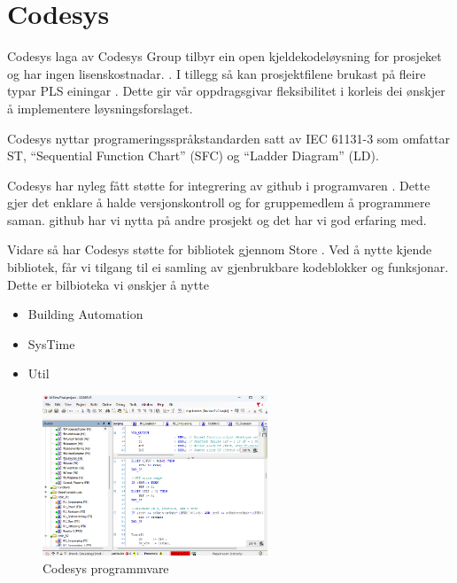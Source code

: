 \section{Codesys}
\thispagestyle{fancy}
\gls{Codesys} \citep{Codesys} laga av \gls{Codesys} Group tilbyr ein open kjeldekodeløysning for prosjeket og har ingen lisenskostnadar. \citep{CodesysLisens}. 
I tillegg så kan prosjektfilene brukast på fleire typar PLS einingar \citep{CodesysPLS}. 
Dette gir vår oppdragsgivar fleksibilitet i korleis dei ønskjer å implementere løysningsforslaget.

\gls{Codesys} nyttar programeringsspråkstandarden satt av \gls{IEC} 61131-3 som omfattar \gls{ST}, ``Sequential Function Chart'' (\gls{SFC}) og ``Ladder Diagram'' (\gls{LD}). 

\gls{Codesys} har nyleg fått støtte for integrering av \gls{github} i programvaren \citep{CodesysGIT}. 
Dette gjer det enklare å halde versjonskontroll og for gruppemedlem å programmere saman. 
\gls{github} har vi nytta på andre prosjekt og det har vi god erfaring med.

Vidare så har \gls{Codesys} støtte for bibliotek gjennom  Store \citep{CodesysStore}. 
Ved å nytte kjende bibliotek, får vi tilgang til ei samling av gjenbrukbare kodeblokker og funksjonar.
Dette er bilbioteka vi ønskjer å nytte

 
\begin{itemize}
    \item {} Building Automation \citep{BuildingAutomation}
    \item SysTime \citep{DateAndTime}
    \item Util \citep{Util} \newline \newline
\end{itemize} 

\begin{figure}[htbp]
    \centering
    \includegraphics[width=0.6\textwidth]{Bilder/Codesys.png}
    \caption{Codesys programmvare}\label{fig:Codesys}
\end{figure}

\newpage
